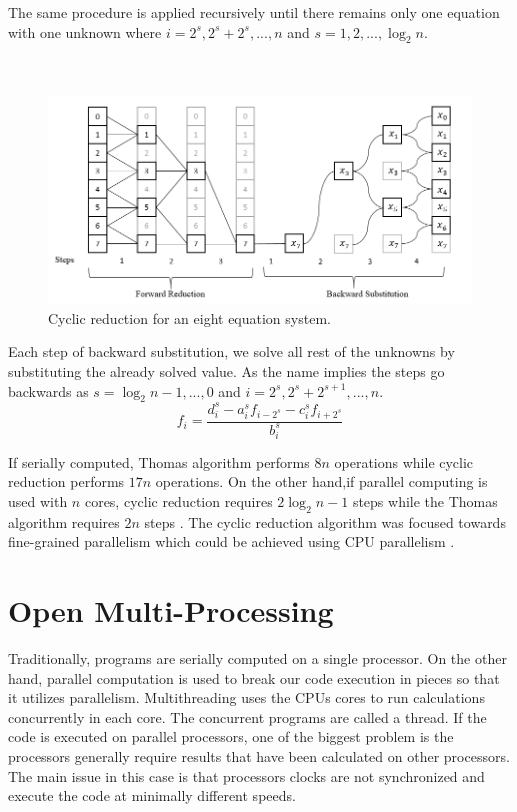 \documentclass[12pt, oneside]{book}
\theoremstyle{plain}
\theoremstyle{definition}
\begin{document}
The same procedure is applied recursively until there remains only one equation with one unknown where $ i = 2^s, 2^s + 2^s, ... , n$ and $s = 1, 2, ... , \log_2 n$. \\\\\\

\begin{figure}[!htb]
    \centering
        \includegraphics[scale=0.7]{cyclic.png}
    \caption{Cyclic reduction for an eight equation system.}
\end{figure}

Each step of backward substitution, we solve all rest of the unknowns by substituting the already solved value. As the name implies the steps go backwards as $s = \log_2 n - 1, ... , 0$ and $ i = 2^s, 2^s + 2^{s+1}, ... , n$.
\begin{equation}
f_i = \frac{d_i^{s} - a_i^{s} f_{i - 2^s}  - c_i^{s} f_{i + 2^s}}{b_i^s}
\end{equation}

If serially computed, Thomas algorithm performs $ 8 n $ operations while cyclic reduction performs $17n$ operations. On the other hand,if parallel computing is used with $n$ cores, cyclic reduction requires $2 \log_2 n - 1$ steps  while the Thomas algorithm requires $2n$ steps \cite{gputri}. The cyclic reduction algorithm was focused towards fine-grained parallelism which could be achieved using CPU parallelism \cite{seltri}.

\section{Open Multi-Processing}
Traditionally, programs are serially computed on a single processor. On the other hand, parallel computation is used to break our code execution in pieces so that it utilizes parallelism. Multithreading uses the CPUs cores to run calculations concurrently in each core. The concurrent programs are called a thread. If the code is executed on parallel processors, one of the biggest problem is the processors generally require results that have been calculated on other processors. The main issue in this case is that processors clocks are not synchronized and execute the code at minimally different speeds.
\end{document}
